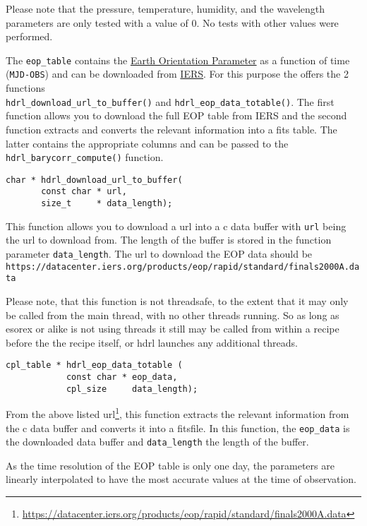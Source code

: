 Please note that the pressure, temperature, humidity, and the
wavelength parameters are only tested with a value of 0. No tests with
other values were performed.

The \verb+eop_table+ contains the
\href{https://www.iers.org/IERS/EN/Science/EarthRotation/EOP.html}{Earth
  Orientation Parameter} as a function of time (\verb+MJD-OBS+) and
can be downloaded from
\href{https://www.iers.org/IERS/EN/Home/home\_node.html}{IERS}. For
this purpose the \HDRL offers the 2 functions
\\ \verb+hdrl_download_url_to_buffer()+ and
\verb+hdrl_eop_data_totable()+. The first function allows you to
download the full EOP table from IERS and the second function extracts
and converts the relevant information into a fits table. The latter
contains the appropriate columns and can be passed to the\\
\verb+hdrl_barycorr_compute()+ function.

\begin{lstlisting}
char * hdrl_download_url_to_buffer(
       const char * url,
       size_t     * data_length);  
\end{lstlisting}
This function allows you to download a url into a c data buffer with
\verb+url+ being the url to download from. The length of the buffer
is stored in the function parameter \verb+data_length+. The url to
download the EOP data should
be \verb+https://datacenter.iers.org/products/eop/rapid/standard/finals2000A.data+

Please note, that this function is not threadsafe, to the extent that
it may only be called from the main thread, with no other threads
running. So as long as esorex or alike is not using threads it still
may be called from within a recipe before the the recipe itself, or
hdrl launches any additional threads.

\begin{lstlisting}
cpl_table * hdrl_eop_data_totable (
            const char * eop_data,
            cpl_size     data_length);
\end{lstlisting}
From the above listed
url\footnote{\url{https://datacenter.iers.org/products/eop/rapid/standard/finals2000A.data}},
this function extracts the relevant information from the c data buffer
and converts it into a fitsfile.  In this function, the
\verb+eop_data+ is the downloaded data buffer and \verb+data_length+
the length of the buffer.

As the time resolution of the EOP table is only one day, the
parameters are linearly interpolated to have the most accurate values
at the time of observation.

